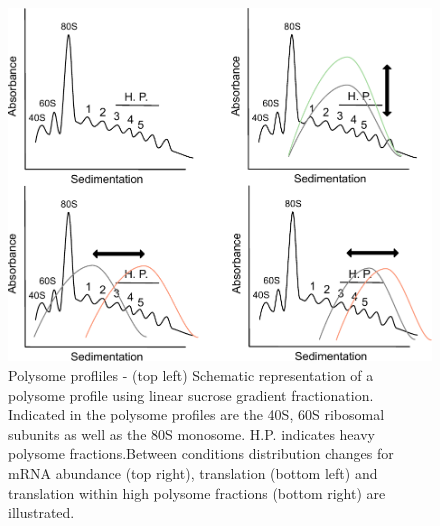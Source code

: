 \documentclass[12pt,openany]{book}
\begin{document}
\begin{figure}
    \includegraphics[width=0.9\linewidth]{./figures/polysome_shifts.pdf}
  \caption{Polysome profliles -  (top left) Schematic representation of a polysome profile using linear sucrose gradient fractionation. Indicated in the polysome profiles are the 40S, 60S ribosomal subunits as well as the 80S monosome. H.P. indicates heavy polysome fractions.Between conditions distribution changes for mRNA abundance (top right), translation (bottom left) and translation within high polysome fractions (bottom right) are illustrated. \label{fig:polysome}}
\end{figure}
\end{document}
